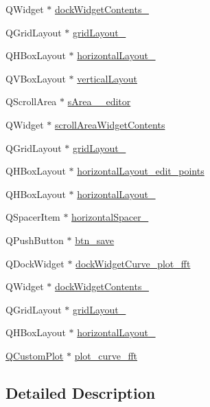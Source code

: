 \begin{DoxyCompactItemize}
\item 
Q\+Widget $\ast$ \hyperlink{a00079_a20ad5110f0fb7b329d067d354f8c9409}{dock\+Widget\+Contents\+\_}
\item 
Q\+Grid\+Layout $\ast$ \hyperlink{a00079_ac56612bd2595405ccbdfe4aae45eccd7}{grid\+Layout\+\_}
\item 
Q\+H\+Box\+Layout $\ast$ \hyperlink{a00079_a42671894c25bd8dfcc6c0a1f8689ecb8}{horizontal\+Layout\+\_}
\item 
Q\+V\+Box\+Layout $\ast$ \hyperlink{a00079_a11b9c1ae90724f0bcd67c76045c93704}{vertical\+Layout}
\item 
Q\+Scroll\+Area $\ast$ \hyperlink{a00079_a6f79b6b1fe81457d76b076a543ee4089}{s\+Area\+\_\+\+\_\+editor}
\item 
Q\+Widget $\ast$ \hyperlink{a00079_a2fd25ae1a2b71980cbe9b9ba2751da3b}{scroll\+Area\+Widget\+Contents}
\item 
Q\+Grid\+Layout $\ast$ \hyperlink{a00079_a8e397832e536976b6717e1d509226b8d}{grid\+Layout\+\_}
\item 
Q\+H\+Box\+Layout $\ast$ \hyperlink{a00079_ae08b661288ecee049945e4a63d0c0af0}{horizontal\+Layout\+\_\+edit\+\_\+points}
\item 
Q\+H\+Box\+Layout $\ast$ \hyperlink{a00079_ade915b192b206af66ce1fb317087ffb6}{horizontal\+Layout\+\_}
\item 
Q\+Spacer\+Item $\ast$ \hyperlink{a00079_a025c1b6f38c90cfa55572934535451a2}{horizontal\+Spacer\+\_}
\item 
Q\+Push\+Button $\ast$ \hyperlink{a00079_a3b0808ff0825375685673655eb4785fc}{btn\+\_\+save}
\item 
Q\+Dock\+Widget $\ast$ \hyperlink{a00079_a7474d72172d9e269e8f3cb22bbe2fc86}{dock\+Widget\+Curve\+\_\+plot\+\_\+fft}
\item 
Q\+Widget $\ast$ \hyperlink{a00079_ae304b249d83cb3152fbbf7a7d7e0e29b}{dock\+Widget\+Contents\+\_}
\item 
Q\+Grid\+Layout $\ast$ \hyperlink{a00079_ab6610272c6c39cba66cab113d98dcdcd}{grid\+Layout\+\_}
\item 
Q\+H\+Box\+Layout $\ast$ \hyperlink{a00079_aaee23fa38e3335cc652ebd35fcdbafc8}{horizontal\+Layout\+\_}
\item 
\hyperlink{a00030_d8/d00/a00186}{Q\+Custom\+Plot} $\ast$ \hyperlink{a00079_a2bdf46ca3b702151408e6f6bd96b3228}{plot\+\_\+curve\+\_\+fft}
\end{DoxyCompactItemize}


\subsection{Detailed Description}



